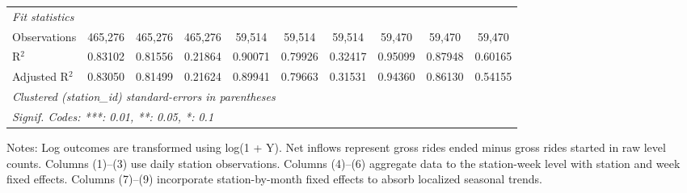\begin{landscape}
\begin{table}[htbp]
\begin{tabular}{lccccccccc}
         \midrule
         \emph{Fit statistics}\\
         
         Observations             & 465,276     & 465,276        & 465,276     & 59,514      & 59,514         & 59,514      & 59,470      & 59,470         & 59,470\\  
         R$^2$                    & 0.83102     & 0.81556        & 0.21864     & 0.90071     & 0.79926        & 0.32417     & 0.95099     & 0.87948        & 0.60165\\  
         Adjusted R$^2$           & 0.83050     & 0.81499        & 0.21624     & 0.89941     & 0.79663        & 0.31531     & 0.94360     & 0.86130        & 0.54155\\  
         
         \midrule \midrule
         \multicolumn{10}{l}{\emph{Clustered (station\_id) standard-errors in parentheses}}\\
         \multicolumn{10}{l}{\emph{Signif. Codes: ***: 0.01, **: 0.05, *: 0.1}}\\
         
      \end{tabular}
      
      
      
      \par \raggedright 
      Notes: Log outcomes are transformed using log(1 + Y). Net inflows represent gross rides ended minus gross rides started in raw level counts. Columns (1)–(3) use daily station observations. Columns (4)–(6) aggregate data to the station-week level with station and week fixed effects. Columns (7)–(9) incorporate station-by-month fixed effects to absorb localized seasonal trends.
      
   \end{table}
\end{landscape}


